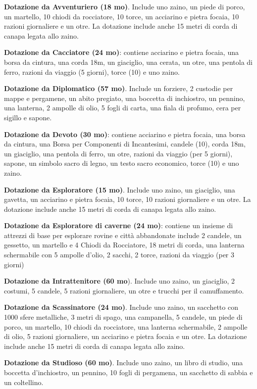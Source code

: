 \documentclass[12pt,a4paper,twoside,openany]{book}
\begin{document}
\begin{multicols}{2}
\textbf{Dotazione da Avventuriero (18 mo)}. Include uno zaino, un piede di porco, un martello, 10 chiodi da rocciatore, 10 torce, un acciarino e pietra focaia, 10 razioni giornaliere e un otre. La dotazione include anche 15 metri di corda di canapa legata allo zaino.

\textbf{Dotazione da Cacciatore (24 mo)}: contiene acciarino e pietra focaia, una borsa da cintura, una corda 18m, un giaciglio, una cerata, un otre, una pentola di ferro, razioni da viaggio (5 giorni), torce (10) e uno zaino.

\textbf{Dotazione da Diplomatico (57 mo)}. Include un forziere, 2 custodie per mappe e pergamene, un abito pregiato, una boccetta di inchiostro, un pennino, una lanterna, 2 ampolle di olio, 5 fogli di carta, una fiala di profumo, cera per sigillo e sapone.


\textbf{Dotazione da Devoto (30 mo)}: contiene acciarino e pietra focaia, una borsa da cintura, una Borsa per Componenti di Incantesimi, candele (10), corda 18m, un giaciglio, una pentola di ferro, un otre, razioni da viaggio (per 5 giorni), sapone, un simbolo sacro di legno, un testo sacro economico, torce (10) e uno zaino.

\textbf{Dotazione da Esploratore (15 mo)}. Include uno zaino, un giaciglio, una gavetta, un acciarino e pietra focaia, 10 torce, 10 razioni giornaliere e un otre. La dotazione include anche 15 metri di corda di canapa legata allo zaino.

\textbf{Dotazione da Esploratore di caverne (24 mo)}: contiene un insieme di attrezzi di base per esplorare rovine e città abbandonate include 2 candele, un gessetto, un martello e 4 Chiodi da Rocciatore, 18 metri di corda, una lanterna schermabile con 5 ampolle d'olio, 2 sacchi, 2 torce, razioni da viaggio (per 3 giorni)

\textbf{Dotazione da Intrattenitore (60 mo}). Include uno zaino, un giaciglio, 2 costumi, 5 candele, 5 razioni giornaliere, un otre e trucchi per il camuffamento.

\textbf{Dotazione da Scassinatore (24 mo)}. Include uno zaino, un sacchetto con 1000 sfere metalliche, 3 metri di spago, una campanella, 5 candele, un piede di porco, un martello, 10 chiodi da rocciatore, una lanterna schermabile, 2 ampolle di olio, 5 razioni giornaliere, un acciarino e pietra focaia e un otre. La dotazione include anche 15 metri di corda di canapa legata allo zaino.

\textbf{Dotazione da Studioso (60 mo)}. Include uno zaino, un libro di studio, una boccetta d'inchiostro, un pennino, 10 fogli di pergamena, un sacchetto di sabbia e un coltellino.


\end{multicols}
\end{document}
